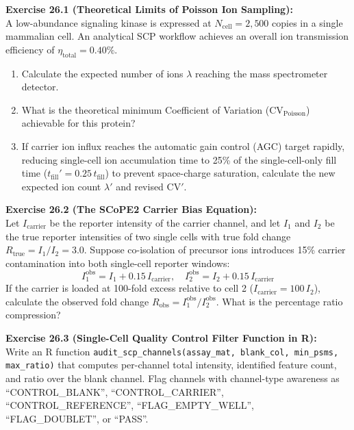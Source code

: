 \documentclass[11pt,twoside,openright]{book}
\begin{document}
\noindent
\textbf{Exercise 26.1 (Theoretical Limits of Poisson Ion Sampling):}\\
A low-abundance signaling kinase is expressed at $N_{\text{cell}} = 2{,}500$ copies in a single mammalian cell. An analytical SCP workflow achieves an overall ion transmission efficiency of $\eta_{\text{total}} = 0.40\%$.
\begin{enumerate}
    \item Calculate the expected number of ions $\lambda$ reaching the mass spectrometer detector.
    \item What is the theoretical minimum Coefficient of Variation ($\text{CV}_{\text{Poisson}}$) achievable for this protein?
    \item If carrier ion influx reaches the automatic gain control (AGC) target rapidly, reducing single-cell ion accumulation time to 25\% of the single-cell-only fill time ($t_{\text{fill}}' = 0.25 \, t_{\text{fill}}$) to prevent space-charge saturation, calculate the new expected ion count $\lambda'$ and revised $\text{CV}'$.
\end{enumerate}

\vspace{0.8em}
\noindent
\textbf{Exercise 26.2 (The SCoPE2 Carrier Bias Equation):}\\
Let $I_{\text{carrier}}$ be the reporter intensity of the carrier channel, and let $I_1$ and $I_2$ be the true reporter intensities of two single cells with true fold change $R_{\text{true}} = I_1 / I_2 = 3.0$. Suppose co-isolation of precursor ions introduces 15\% carrier contamination into both single-cell reporter windows:
\begin{equation}
I_1^{\text{obs}} = I_1 + 0.15 \, I_{\text{carrier}}, \quad I_2^{\text{obs}} = I_2 + 0.15 \, I_{\text{carrier}}
\end{equation}
If the carrier is loaded at 100-fold excess relative to cell 2 ($I_{\text{carrier}} = 100 \, I_2$), calculate the observed fold change $R_{\text{obs}} = I_1^{\text{obs}} / I_2^{\text{obs}}$. What is the percentage ratio compression?

\vspace{0.8em}
\noindent
\textbf{Exercise 26.3 (Single-Cell Quality Control Filter Function in R):}\\
Write an R function \texttt{audit\_scp\_channels(assay\_mat, blank\_col, min\_psms, max\_ratio)} that computes per-channel total intensity, identified feature count, and ratio over the blank channel. Flag channels with channel-type awareness as ``CONTROL\_BLANK'', ``CONTROL\_CARRIER'', ``CONTROL\_REFERENCE'', ``FLAG\_EMPTY\_WELL'', ``FLAG\_DOUBLET'', or ``PASS''.
\end{document}
